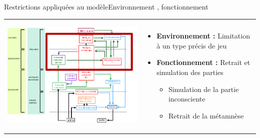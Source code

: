 \begin{frame}{Restrictions appliquées au modèle}{Environnement , fonctionnement}
\begin{tabular}{l l}
\begin{minipage}{0.6\textwidth}\begin{center}
\includegraphics[width=\textwidth]{img/analyse_generale/modele_restraint}
\end{center}\end{minipage} & \begin{minipage}{0.4\textwidth}
\begin{itemize}
  \item \textbf{Environnement : }Limitation à un type précis de jeu
  \item \textbf{Fonctionnement : }Retrait et simulation des parties
  \begin{itemize}
    \item Simulation de la partie inconsciente
    \item Retrait de la métamnèse
  \end{itemize}
\end{itemize}
\end{minipage}
\end{tabular}
\end{frame}
